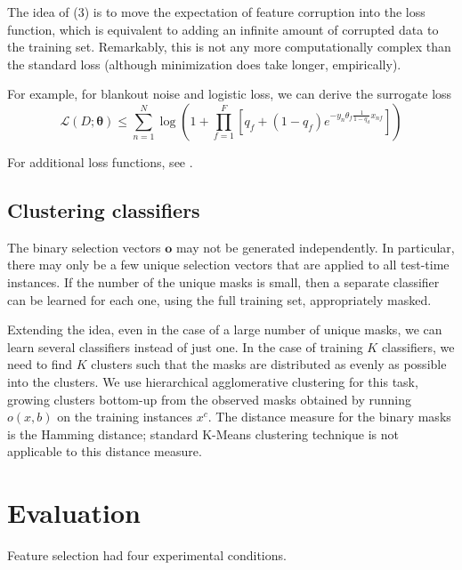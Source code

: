 The idea of (3) is to move the expectation of feature corruption into the loss function, which is equivalent to adding an infinite amount of corrupted data to the training set.
Remarkably, this is not any more computationally complex than the standard loss (although minimization does take longer, empirically).

For example, for blankout noise and logistic loss, we can derive the surrogate loss
\begin{equation}
\mathcal{L}(D; \mathbf{\theta}) \leq \sum_{n=1}^N \log \left( 1 + \prod_{f=1}^F \left[ q_f + (1 - q_f) e^{-y_n \theta_f \frac{1}{1 - q_d} x_{nf}} \right] \right)
\end{equation}

For additional loss functions, see \cite{Maaten-ICML-2013}.

\subsection{Clustering classifiers}

The binary selection vectors $\mathbf{o}$ may not be generated independently.
In particular, there may only be a few unique selection vectors that are applied to all test-time instances.
If the number of the unique masks is small, then a separate classifier can be learned for each one, using the full training set, appropriately masked.

Extending the idea, even in the case of a large number of unique masks, we can learn several classifiers instead of just one.
In the case of training $K$ classifiers, we need to find $K$ clusters such that the masks are distributed as evenly as possible into the clusters.
We use hierarchical agglomerative clustering for this task, growing clusters bottom-up from the observed masks obtained by running $o(x, b)$ on the training instances $x^c$.
The distance measure for the binary masks is the Hamming distance; standard K-Means clustering technique is not applicable to this distance measure.

\section{Evaluation}

Feature selection had four experimental conditions.

